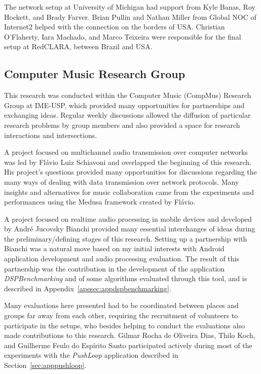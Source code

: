The network setup at University of Michigan had support from Kyle Banas, Roy Hockett, and Brady Farver.
Brian Pullin and Nathan Miller from Global NOC of Internet2 helped with the connection on the borders of USA.
Christian O'Flaherty, Iara Machado, and Marco Teixeira were responsible for the final setup at RedCLARA, between Brazil and USA.

\subsection*{Computer Music Research Group}
This research was conducted within the Computer Music (CompMus) Research Group at IME-USP, which provided many opportunities for partnerships and exchanging ideas.
Regular weekly discussions allowed the diffusion of particular research problems by group members and also provided a space for research interactions and intersections.

A project focused on multichannel audio transmission over computer networks was led by Flávio Luiz Schiavoni and overlapped the beginning of this research.
His project's questions provided many opportunities for discussions regarding the many ways of dealing with data transmission over network protocols.
Many insights and alternatives for music collaboration came from the experiments and performances using the Medusa framework created by Flávio.

A project focused on realtime audio processing in mobile devices and developed by André Jucovsky Bianchi provided many essential interchanges of ideas during the preliminary/defining stages of this research.
Setting up a partnership with Bianchi was a natural move based on my initial interests with Android application development and audio processing evaluation.
The result of this partnership was the contribution in the development of the application \textit{DSPBenchmarking} and of some algorithms evaluated through this tool, and is described in Appendix~\ref{apesec:appdspbenchmarking}.

Many evaluations here presented had to be coordinated between places and groups far away from each other, requiring the recruitment of volunteers to participate in the setups, who besides helping to conduct the evaluations also made contributions to this research.
Gilmar Rocha de Oliveira Dias, Thilo Koch, and Guilherme Feulo do Espírito Santo participated actively during most of the experiments with the \textit{PushLoop} application described in Section~\ref{sec:apppushloop}.

